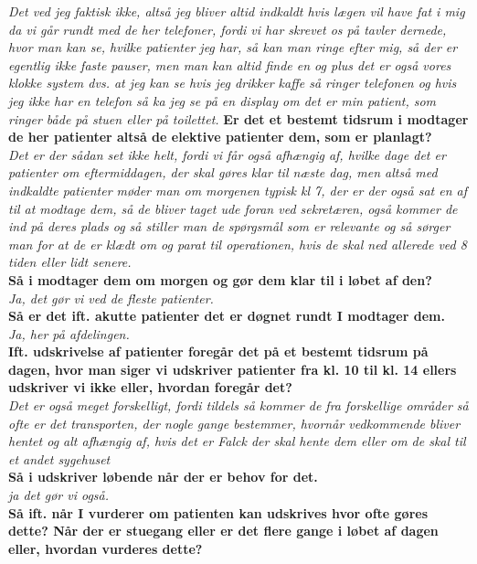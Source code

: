 \noindent
\textit{Det ved jeg faktisk ikke, altså jeg bliver altid indkaldt hvis lægen vil have fat i mig da vi går rundt med de her telefoner, fordi vi har skrevet os på tavler dernede, hvor man kan se, hvilke patienter jeg har, så kan man ringe efter mig, så der er egentlig ikke faste pauser, men man kan altid finde en og plus det er også vores klokke system dvs. at jeg kan se hvis jeg drikker kaffe så ringer telefonen og hvis jeg ikke har en telefon så ka jeg se på en display om det er min patient, som ringer både på stuen eller på toilettet.} 
\textbf{Er det et bestemt tidsrum i modtager de her patienter altså de elektive patienter dem, som er planlagt?}\\
\noindent
\textit{Det er der sådan set ikke helt, fordi vi får også afhængig af, hvilke dage det er patienter om eftermiddagen, der skal gøres klar til næste dag, men altså med indkaldte patienter møder man om morgenen typisk kl 7, der er der også sat en af til at modtage dem, så de bliver taget ude foran ved sekretæren, også kommer de ind på deres plads og så stiller man de spørgsmål som er relevante og så sørger man for at de er klædt om og parat til operationen, hvis de skal ned allerede ved 8 tiden eller lidt senere.}\\
\noindent
\textbf{Så i modtager dem om morgen og gør dem klar til i løbet af den?}\\
\noindent
\textit{Ja, det gør vi ved de fleste patienter.}\\
\noindent
\textbf{Så er det ift. akutte patienter det er døgnet rundt I modtager dem.}\\
\noindent
\textit{Ja, her på afdelingen. }\\
\noindent
\textbf{Ift. udskrivelse af patienter foregår det på et bestemt tidsrum på dagen, hvor man siger vi udskriver patienter fra kl. 10 til kl. 14 ellers udskriver vi ikke eller, hvordan foregår det?}\\
\noindent
\textit{Det er også meget forskelligt, fordi tildels så kommer de fra forskellige områder så ofte er det transporten, der nogle gange bestemmer, hvornår vedkommende bliver hentet og alt afhængig af, hvis det er Falck der skal hente dem eller om de skal til et andet sygehuset }\\
\noindent
\textbf{Så i udskriver løbende når der er behov for det.}\\
\noindent
\textit{ja det gør vi også.}\\
\noindent
\textbf{Så ift. når I vurderer om patienten kan udskrives hvor ofte gøres dette? Når der er stuegang eller er det flere gange i løbet af dagen eller, hvordan vurderes dette?}\\
